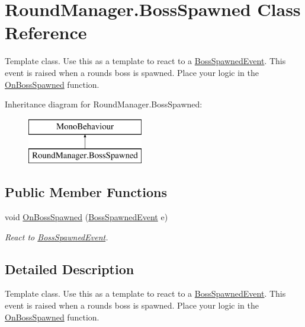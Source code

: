 \hypertarget{class_round_manager_1_1_boss_spawned}{}\section{Round\+Manager.\+Boss\+Spawned Class Reference}
\label{class_round_manager_1_1_boss_spawned}


Template class. Use this as a template to react to a \hyperlink{class_round_manager_1_1_events_1_1_boss_spawned_event}{Boss\+Spawned\+Event}. This event is raised when a rounds boss is spawned. Place your logic in the \hyperlink{class_round_manager_1_1_boss_spawned_ae1391ac6a4e82aeee73c55b1db02ebda}{On\+Boss\+Spawned} function.  


Inheritance diagram for Round\+Manager.\+Boss\+Spawned\+:\begin{figure}[H]
\begin{center}
\leavevmode
\includegraphics[height=2.000000cm]{class_round_manager_1_1_boss_spawned}
\end{center}
\end{figure}
\subsection*{Public Member Functions}
\begin{DoxyCompactItemize}
\item 
void \hyperlink{class_round_manager_1_1_boss_spawned_ae1391ac6a4e82aeee73c55b1db02ebda}{On\+Boss\+Spawned} (\hyperlink{class_round_manager_1_1_events_1_1_boss_spawned_event}{Boss\+Spawned\+Event} e)
\begin{DoxyCompactList}\small\item\em React to \hyperlink{class_round_manager_1_1_events_1_1_boss_spawned_event}{Boss\+Spawned\+Event}. \end{DoxyCompactList}\end{DoxyCompactItemize}


\subsection{Detailed Description}
Template class. Use this as a template to react to a \hyperlink{class_round_manager_1_1_events_1_1_boss_spawned_event}{Boss\+Spawned\+Event}. This event is raised when a rounds boss is spawned. Place your logic in the \hyperlink{class_round_manager_1_1_boss_spawned_ae1391ac6a4e82aeee73c55b1db02ebda}{On\+Boss\+Spawned} function. 



